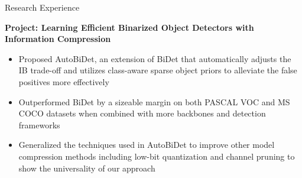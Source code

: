 \documentclass{resume} %
\begin{document}
\begin{rSection}{Research Experience}
\vspace{-0.35cm}

\textbf{Project: Learning Efficient Binarized Object Detectors with Information Compression}
\begin{itemize}
    \item Proposed AutoBiDet, an extension of BiDet that automatically adjusts the IB trade-off and utilizes class-aware sparse object priors to alleviate the false positives more effectively
    \item Outperformed BiDet by a sizeable margin on both PASCAL VOC and MS COCO datasets when combined with more backbones and detection frameworks
    \item Generalized the techniques used in AutoBiDet to improve other model compression methods including low-bit quantization and channel pruning to show the universality of our approach\newline
\end{itemize}

\iffalse
{\textbf{Tsinghua University}, Beijing, China} \hfill {\em Aug, 2018 -- Apr, 2019}\newline
\emph{\href{http://ivg.au.tsinghua.edu.cn/index.php}{Intelligent Vision Group}, Department of Automation}\newline
Research Assistant, Advisors: Profs. \href{https://www.tsinghua.edu.cn/publish/auen/1713/2011/20110506103534247867775/20110506103534247867775_.html}{Jianjiang Feng} \& \href{https://www.tsinghua.edu.cn/publish/auen/1713/2011/20110506105532098625469/20110506105532098625469_.html}{Jie Zhou}\newline
\textbf{Project: A Cascade Regression Model for Cardiac Landmark Detection}
\begin{itemize}
    \item Apply cascade method to achieve state-of-the-art cardiac landmark detection result
    \item Take the advantages of two structures that utilize global information and local context to get accurate and fast regression output
    \item Lay the foundation for weakly-supervised heart segmentation approaches in the future\newline
\end{itemize}
\fi

\iffalse
\textbf{Project: CFUN: Combining Faster R-CNN and U-net Network for Efficient Whole Heart Segmentation}
\begin{itemize}
    \item Propose a novel network architecture combining state-of-the-art object detection framework Faster R-CNN and segmentation framework U-net
    \item Introduce an elaborate-designed loss called edge loss which can greatly boost the ability of segmentation
    \item Achieve relatively competitive performances while reducing the time needed for medical image processing compared to state-of-the-art methods
\end{itemize}
\fi
\end{rSection}
\end{document}
